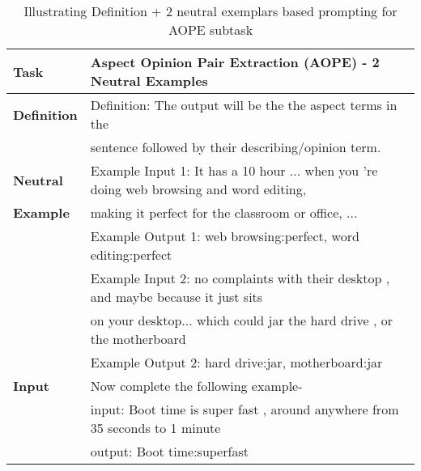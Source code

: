 \documentclass[11pt]{article}
\begin{document}
\begin{table*}[]
\resizebox{\linewidth}{!}
{
\begin{tabular}{ll}
\hline
\textbf{Task} & Aspect Opinion Pair Extraction (AOPE) - 2 Neutral Examples \\ 
\hline                                                  
\textbf{Definition} & Definition: The output will be the the aspect terms in the \\
& sentence followed by their describing/opinion term.\\ 
\hline                                                                    
\textbf{Neutral}    & Example Input 1: It has a 10 hour ... when you 're doing web browsing and word editing,\\
\textbf{Example}    & making it perfect for the classroom or office, ...          \\
\textbf{}           & Example Output 1: web browsing:perfect, word editing:perfect          \\                  
\textbf{}           & Example Input 2: no complaints with their desktop , and maybe because it just sits \\ 
\textbf{}           & on your desktop... which could jar the hard drive , or the motherboard     \\ 
\textbf{}           & Example Output 2: hard drive:jar, motherboard:jar                    \\ 
\hline 
\textbf{Input}      & Now complete the following example-                                \\
\textbf{}           & input: Boot time is super fast , around anywhere from 35 seconds to 1 minute \\
                    & output: Boot time:superfast\\ \hline
\end{tabular}
}
\caption{
     Illustrating Definition + 2 neutral exemplars based prompting for AOPE subtask}
\label{tab:absa4_aope}
\end{table*} 
\end{document}
